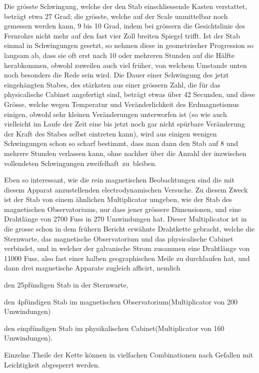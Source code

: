 Die grösste Schwingung, welche der den Stab einschliessende Kasten verstattet, beträgt etwa 27 Grad; die grösste, welche auf der Scale unmittelbar noch gemessen werden kann, 9 bis 10 Grad, indem bei grössern die Gesichtslinie des Fernrohrs nicht mehr auf den fast vier Zoll breiten Spiegel trifft. Ist der Stab einmal in Schwingungen gesetzt, so nehmen diese in geometrischer Progression so langsam ab, dass sie oft erst nach 10 oder mehreren Stunden auf die Hälfte herabkommen, obwohl zuweilen auch viel früher, von welchem Umstande unten noch besonders die Rede sein wird. Die Dauer einer Schwingung des jetzt eingehängten Stabes, des stärksten aus einer grössern Zahl, die für das physicalische Cabinet angefertigt sind, beträgt etwas über 42 Secunden, und diese Grösse, welche wegen Temperatur und Veränderlichkeit des Erdmagnetismus einigen, obwohl sehr kleinen Veränderungen unterworfen ist (so wie auch vielleicht im Laufe der Zeit eine bis jetzt noch gar nicht spürbare Veränderung der Kraft des Stabes selbst eintreten kann), wird aus einigen wenigen Schwingungen schon so scharf bestimmt, dass man dann den Stab auf 8 und mehrere Stunden verlassen kann, ohne nachher über die Anzahl der inzwischen vollendeten Schwingungen zweifelhaft~zu~bleiben.

\par\clearpage
{}
Eben so interessant, wie die rein magnetischen Beobachtungen sind die mit diesem Apparat anzustellenden electrodynamischen Versuche. Zu diesem Zweck ist der Stab von einem ähnlichen Multiplicator umgeben, wie der Stab des magnetischen Observatoriums, nur dass jener grössere Dimensionen, und eine Drahtlänge von 2700 Fuss in 270 Umwindungen hat. Dieser Multiplicator ist in die grosse schon in dem frühern Bericht erwähnte Drahtkette gebracht, welche die Sternwarte, das magnetische Observatorium und das physicalische Cabinet verbindet, und in welcher der galvanische Strom zusammen eine Drahtlänge von 11000 Fuss, also fast einer halben geographischen Meile zu durchlaufen hat, und dann drei magnetische Apparate zugleich afficirt, nemlich
\begin{list}{}{%
  \setlength{\leftmargin}{.108\linewidth}%
  \setlength{\labelwidth}{.047\linewidth}%
  \setlength{\labelsep}{.014\linewidth}%
  \setlength{\topsep}{0pt}%
  \setlength{\partopsep}{0pt}%
  \setlength{\itemsep}{0pt}%
  \setlength{\parsep}{0pt}}
\item[I.] den 25pfündigen Stab in der Sternwarte,
\item[II.] den 4pfündigen Stab im magnetischen Observatorium\newline (Multiplicator von 200 Umwindungen)
\item[III.] den einpfündigen Stab im physikalischen Cabinet\newline (Multiplicator von 160 Umwindungen).
\end{list}
\noindent Einzelne Theile der Kette können in vielfachen Combinationen nach Gefallen mit Leichtigkeit abgesperrt werden.

